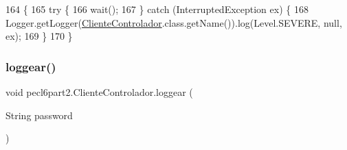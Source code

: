 \begin{DoxyCode}
164         \{
165             \textcolor{keywordflow}{try} \{
166                 wait();
167             \} \textcolor{keywordflow}{catch} (InterruptedException ex) \{
168                 Logger.getLogger(\mbox{\hyperlink{classpecl6part2_1_1_cliente_controlador_a6e526681bd2137858bfb2940eeb23cc8}{ClienteControlador}}.class.getName()).log(Level.SEVERE, 
      null, ex);
169             \}
170         \}
\end{DoxyCode}
\mbox{\label{classpecl6part2_1_1_cliente_controlador_acaff5088389f8aa5f3571c802b910d28}} 
\subsubsection{\texorpdfstring{loggear()}{loggear()}}
{\footnotesize\ttfamily void pecl6part2.\+Cliente\+Controlador.\+loggear (\begin{DoxyParamCaption}\item[{String}]{password }\end{DoxyParamCaption})\hspace{0.3cm}{\ttfamily [inline]}}


